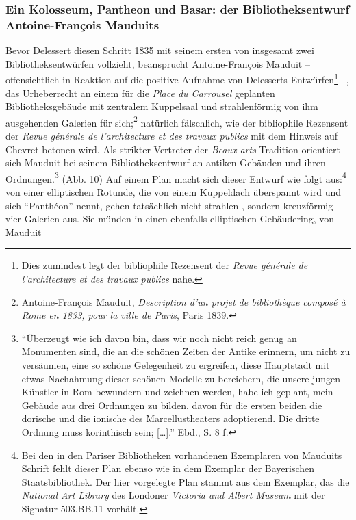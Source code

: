 \subsubsection{Ein Kolosseum, Pantheon und Basar: der Bibliotheksentwurf
Antoine-François
Mauduits}\label{ein-kolosseum-pantheon-und-basar-der-bibliotheksentwurf-antoine-franuxe7ois-mauduits}

Bevor Delessert diesen Schritt 1835 mit seinem ersten von insgesamt zwei
Bibliotheksentwürfen vollzieht, beansprucht Antoine-François Mauduit --
offensichtlich in Reaktion auf die positive Aufnahme von Delesserts
Entwürfen\footnote{Dies zumindest legt der bibliophile Rezensent der
  \emph{Revue générale de l'architecture et des travaux publics} nahe.}
--, das Urheberrecht an einem für die \emph{Place du Carrousel}
geplanten Bibliotheksgebäude mit zentralem Kuppelsaal und strahlenförmig
von ihm ausgehenden Galerien für sich;\footnote{Antoine-François
  Mauduit, \emph{Description d'un projet de bibliothèque composé à Rome
  en 1833, pour la ville de Paris}, Paris 1839.} natürlich fälschlich,
wie der bibliophile Rezensent der \emph{Revue générale de l'architecture
et des travaux publics} mit dem Hinweis auf Chevret betonen wird. Als
strikter Vertreter der \emph{Beaux-arts}-Tradition orientiert sich
Mauduit bei seinem Bibliotheksentwurf an antiken Gebäuden und ihren
Ordnungen.\footnote{\enquote{Überzeugt wie ich davon bin, dass wir noch
  nicht reich genug an Monumenten sind, die an die schönen Zeiten der
  Antike erinnern, um nicht zu versäumen, eine so schöne Gelegenheit zu
  ergreifen, diese Hauptstadt mit etwas Nachahmung dieser schönen
  Modelle zu bereichern, die unsere jungen Künstler in Rom bewundern und
  zeichnen werden, habe ich geplant, mein Gebäude aus drei Ordnungen zu
  bilden, davon für die ersten beiden die dorische und die ionische des
  Marcellustheaters adoptierend. Die dritte Ordnung muss korinthisch
  sein; {[}\ldots{}{]}.} Ebd., S. 8 f.} (Abb. 10) Auf einem Plan macht
sich dieser Entwurf wie folgt aus:\footnote{Bei den in den Pariser
  Bibliotheken vorhandenen Exemplaren von Mauduits Schrift fehlt dieser
  Plan ebenso wie in dem Exemplar der Bayerischen Staatsbibliothek. Der
  hier vorgelegte Plan stammt aus dem Exemplar, das die \emph{National
  Art Library} des Londoner \emph{Victoria and Albert Museum} mit der
  Signatur 503.BB.11 vorhält.} von einer elliptischen Rotunde, die von
einem Kuppeldach überspannt wird und sich \enquote{Panthéon} nennt,
gehen tatsächlich nicht strahlen-, sondern kreuzförmig vier Galerien
aus. Sie münden in einen ebenfalls elliptischen Gebäudering, von Mauduit
